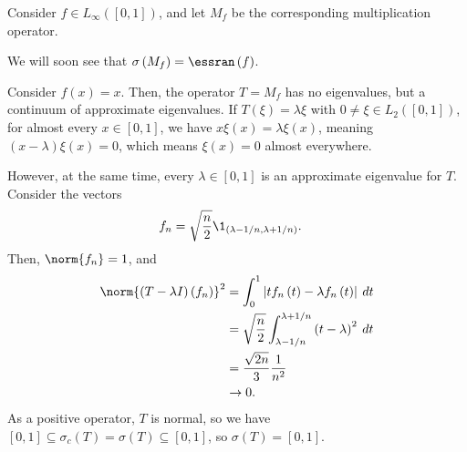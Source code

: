 \documentclass[10pt]{mypackage}
\begin{document}
\begin{example}
  Consider $f\in L_{\infty}\left([0,1]\right)$, and let $M_f$ be the corresponding multiplication operator.\newline

  We will soon see that $\sigma\left(M_f\right) = \essran\left(f\right)$.\newline

  Consider $f(x) = x$. Then, the operator $T = M_f$ has no eigenvalues, but a continuum of approximate eigenvalues. If $T\left(\xi\right) = \lambda \xi$ with $0\neq \xi \in L_2\left([0,1]\right)$, for almost every $x\in [0,1]$, we have $x\xi\left(x\right) = \lambda \xi\left(x\right)$, meaning $\left(x - \lambda\right)\xi\left(x\right) = 0$, which means $\xi\left(x\right) = 0$ almost everywhere.\newline

  However, at the same time, every $\lambda\in [0,1]$ is an approximate eigenvalue for $T$. Consider the vectors
  \begin{align*}
    f_n &= \sqrt{\frac{n}{2}}\1_{\left(\lambda-1/n,\lambda+1/n\right)}.
  \end{align*}
  Then, $\norm{f_n} = 1$, and
  \begin{align*}
    \norm{\left(T - \lambda I\right)\left(f_n\right)}^2 &= \int_{0}^{1} \left\vert tf_n\left(t\right) - \lambda f_n\left(t\right) \right\vert\:dt\\
                                                        &= \sqrt{\frac{n}{2}}\int_{\lambda-1/n}^{\lambda+1/n} \left(t - \lambda\right)^2\:dt\\
                                                        &= \frac{\sqrt{2n}}{3}\frac{1}{n^2}\\
                                                        &\rightarrow 0.
  \end{align*}
  As a positive operator, $T$ is normal, so we have $\left[0,1\right] \subseteq \sigma_c\left(T\right) = \sigma\left(T\right) \subseteq \left[0,1\right]$, so $\sigma\left(T\right) = \left[0,1\right]$.
\end{example}
\end{document}
